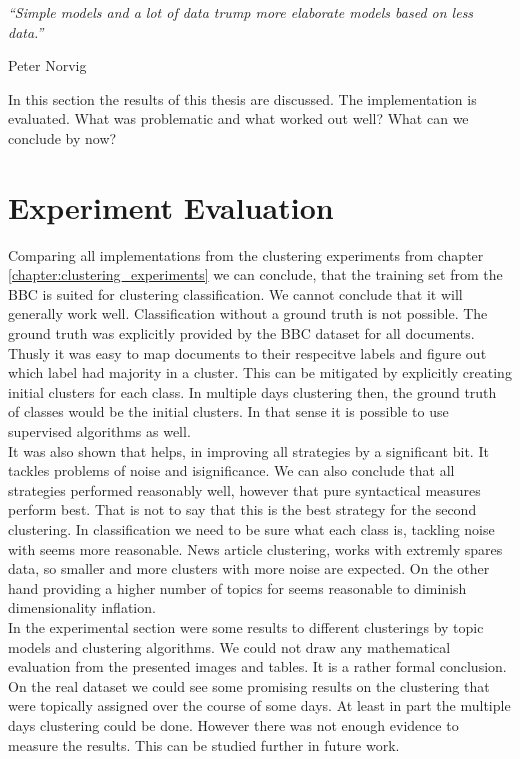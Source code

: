 \epigraph{\emph{
  ``Simple models and a lot of data trump more elaborate models based on less data.''
}}{ Peter Norvig }

In this section the results of this thesis are discussed. The implementation is evaluated. What was problematic and what worked out well? What can we conclude by now?


\section{Experiment Evaluation}
Comparing all implementations from the clustering experiments from chapter \ref{chapter:clustering_experiments} we can conclude, that the training set from the BBC is suited for clustering classification. We cannot conclude that it will generally work well. Classification without a ground truth is not possible. The ground truth was explicitly provided by the BBC dataset for all documents. Thusly it was easy to map documents to their respecitve labels and figure out which label had majority in a cluster. This can be mitigated by explicitly creating initial clusters for each class. In multiple days clustering then, the ground truth of classes would be the initial clusters. In that sense it is possible to use supervised algorithms as well.\\

It was also shown that \lsa{} helps, in improving all strategies by a significant bit. It tackles problems of noise and isignificance. We can also conclude that all strategies performed reasonably well, however that pure syntactical measures perform best. That is not to say that this is the best strategy for the second clustering. In classification we need to be sure what each class is, tackling noise with \lsa{} seems more reasonable. News article clustering, works with extremly spares data, so smaller and more clusters with more noise are expected. On the other hand providing a higher number of topics for \lsa{} seems reasonable to diminish dimensionality inflation.\\

In the experimental section were some results to different clusterings by topic models and clustering algorithms. We could not draw any mathematical evaluation from the presented images and tables. It is a rather formal conclusion. On the real dataset we could see some promising results on the clustering that were topically assigned over the course of some days. At least in part the multiple days clustering could be done. However there was not enough evidence to measure the results. This can be studied further in future work.

